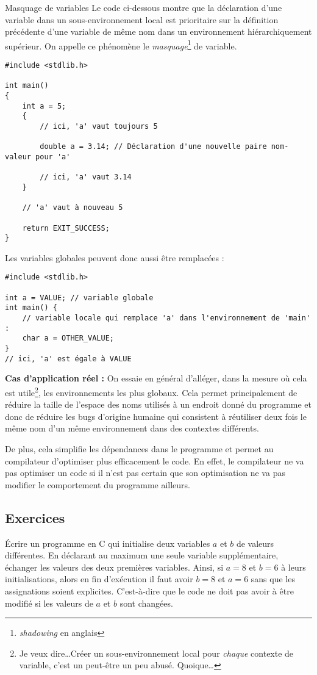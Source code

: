 \documentclass[../../../main.tex]{subfiles}
\begin{document}
\begin{minitelbasicbox}{Masquage de variables}
Le code ci-dessous montre que la déclaration d'une variable dans un sous-environnement local est prioritaire sur la définition précédente d'une variable de même nom dans un environnement hiérarchiquement supérieur. On appelle ce phénomène le \textit{masquage}\footnote{\textit{shadowing} en anglais} de variable.
\begin{verbatim}
#include <stdlib.h>

int main()
{
	int a = 5;
	{
		// ici, 'a' vaut toujours 5
		
		double a = 3.14; // Déclaration d'une nouvelle paire nom-valeur pour 'a'
		
		// ici, 'a' vaut 3.14
	}

	// 'a' vaut à nouveau 5
	
	return EXIT_SUCCESS;
}

\end{verbatim}
Les variables globales peuvent donc aussi être remplacées :
\begin{verbatim}
#include <stdlib.h>

int a = VALUE; // variable globale
int main() {
	// variable locale qui remplace 'a' dans l'environnement de 'main' :
	char a = OTHER_VALUE;
}
// ici, 'a' est égale à VALUE
\end{verbatim}
\end{minitelbasicbox}

\textbf{Cas d'application réel :} On essaie en général d'alléger, dans la mesure où cela est utile\footnote{Je veux dire\dots Créer un sous-environnement local pour \textit{chaque} contexte de variable, c'est un peut-être un peu abusé. Quoique\dots}, les environnements les plus globaux. Cela permet principalement de réduire la taille de l'espace des noms utilisés à un endroit donné du programme et donc de réduire les bugs d'origine humaine qui consistent à réutiliser deux fois le même nom d'un même environnement dans des contextes différents.

De plus, cela simplifie les dépendances dans le programme et permet au compilateur d'optimiser plus efficacement le code. En effet, le compilateur ne va pas optimiser un code si il n'est pas certain que son optimisation ne va pas modifier le comportement du programme ailleurs.
\subsection{Exercices}
 Écrire un programme en C qui initialise deux variables $a$ et $b$ de valeurs différentes. En déclarant au maximum une seule variable supplémentaire, échanger les valeurs des deux premières variables. Ainsi, si $a = 8$ et $b = 6$ à leurs initialisations, alors en fin d'exécution il faut avoir $b = 8$ et $a = 6$ sans que les assignations soient explicites. C'est-à-dire que le code ne doit pas avoir à être modifié si les valeurs de $a$ et $b$ sont changées.
\end{document}
